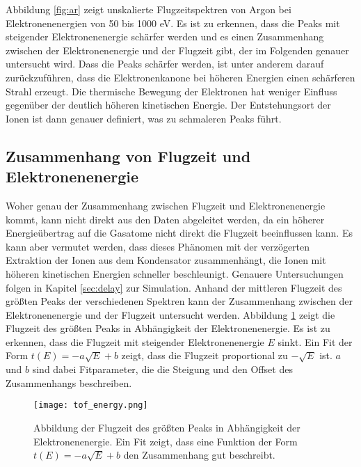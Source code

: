 Abbildung \ref{fig:ar} zeigt unskalierte Flugzeitspektren von Argon bei Elektronenenergien von 50 bis 1000 eV. Es ist zu erkennen, dass die Peaks mit steigender Elektronenenergie schärfer werden und es einen Zusammenhang zwischen der Elektronenenergie und der Flugzeit gibt, der im Folgenden genauer untersucht wird. Dass die Peaks schärfer werden, ist unter anderem darauf zurückzuführen, dass die Elektronenkanone bei höheren Energien einen schärferen Strahl erzeugt. Die thermische Bewegung der Elektronen hat weniger Einfluss gegenüber der deutlich höheren kinetischen Energie. Der Entstehungsort der Ionen ist dann genauer definiert, was zu schmaleren Peaks führt.

\subsection{Zusammenhang von Flugzeit und Elektronenenergie}
Woher genau der Zusammenhang zwischen Flugzeit und Elektronenenergie kommt, kann nicht direkt aus den Daten abgeleitet werden, da ein höherer Energieübertrag auf die Gasatome nicht direkt die Flugzeit beeinflussen kann. Es kann aber vermutet werden, dass dieses Phänomen mit der verzögerten Extraktion der Ionen aus dem Kondensator zusammenhängt, die Ionen mit höheren kinetischen Energien schneller beschleunigt. Genauere Untersuchungen folgen in Kapitel \ref{sec:delay} zur Simulation. Anhand der mittleren Flugzeit des größten Peaks der verschiedenen Spektren kann der Zusammenhang zwischen der Elektronenenergie und der Flugzeit untersucht werden.
Abbildung \ref{fig:tof_energy} zeigt die Flugzeit des größten Peaks in Abhängigkeit der Elektronenenergie. Es ist zu erkennen, dass die Flugzeit mit steigender Elektronenenergie $E$ sinkt. Ein Fit der Form $t(E) = -a\sqrt{E} + b$ zeigt, dass die Flugzeit proportional zu $-\sqrt{E}$ ist. $a$ und $b$ sind dabei Fitparameter, die die Steigung und den Offset des Zusammenhangs beschreiben. 

\begin{figure}
    \centering
    \texttt{[image: tof\_energy.png]}
    \caption[Zusammenhang zwischen TOF und Elektronenenergie]{Abbildung der Flugzeit des größten Peaks in Abhängigkeit der Elektronenenergie. Ein Fit zeigt, dass eine Funktion der Form $t(E) = -a\sqrt{E} + b$ den Zusammenhang gut beschreibt.}
    \label{fig:tof_energy}
\end{figure}

